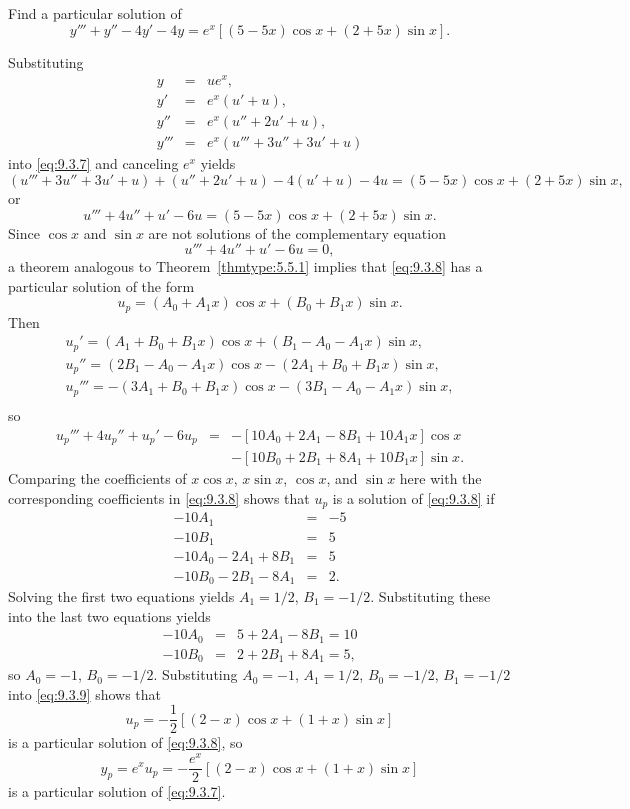 \documentclass{ximera}
\begin{document}
\begin{example}\label{example:9.3.3}
Find a particular solution of
\begin{equation} \label{eq:9.3.7}
y'''+y''-4y'-4y=e^x[(5-5x)\cos x+(2+5x)\sin x].
\end{equation}


\begin{explanation}
Substituting
\begin{eqnarray*}
y&=&ue^x,\\ y'&=&e^x(u'+u),\\
y''&=&e^x(u''+2u'+u),\\
y'''&=&e^x(u'''+3u''+3u'+u)
\end{eqnarray*}
into \eqref{eq:9.3.7} and canceling $e^x$ yields
$$
(u'''+3u''+3u'+u)+(u''+2u'+u)-4(u'+u)-4u
=(5-5x)\cos x+(2+5x)\sin x,
$$
or
\begin{equation} \label{eq:9.3.8}
u'''+4u''+u'-6u=(5-5x)\cos x+(2+5x)\sin x.
\end{equation}
Since $\cos x$ and $\sin x$ are not solutions of the complementary
equation
$$
u'''+4u''+u'-6u=0,
$$
a theorem analogous to Theorem~\ref{thmtype:5.5.1} implies that
\eqref{eq:9.3.8} has a particular solution of the form
\begin{equation} \label{eq:9.3.9}
u_p=(A_0+A_1x)\cos x+(B_0+B_1x)\sin x.
\end{equation}
Then
\begin{eqnarray*}
u_p'=(A_1+B_0+B_1x)\cos x+(B_1-A_0-A_1x)\sin x,\\
 u_p''=(2B_1-A_0-A_1x)\cos x-(2A_1+B_0+B_1x)\sin x,\\
 u_p'''=-(3A_1+B_0+B_1x)\cos x-(3B_1-A_0-A_1x)\sin x,\\
\end{eqnarray*}
so
$$
\begin{array}{rcl}
u_p'''+4u_p''+u_p'-6u_p&=&-\left[10A_0+2A_1-8B_1+10A_1x\right]\cos
x\\ &&- \left[10B_0+2B_1+8A_1+10B_1x\right]\sin x.
\end{array}
$$
Comparing the coefficients of $x\cos x$, $x\sin x$, $\cos x$, and
$\sin x$ here with the corresponding coefficients in \eqref{eq:9.3.8}
shows that $u_p$ is a solution of \eqref{eq:9.3.8} if
$$
\begin{array}{rcr}
-10A_1&=&-5\\
-10B_1&=&5\\
-10A_0-2A_1+8B_1&=&5\\
-10B_0-2B_1-8A_1&=&2.
\end{array}
$$
Solving the first two equations yields $A_1=1/2$, $B_1=-1/2$.
Substituting these into the last two equations  yields
\begin{eqnarray*}
-10A_0&=&5+2A_1-8B_1=10\\
-10B_0&=&2+2B_1+8A_1=5,
 \end{eqnarray*}
so $A_0=-1$, $B_0=-1/2$.
Substituting $A_0=-1$, $A_1=1/2$, $B_0=-1/2$, $B_1=-1/2$ into
\eqref{eq:9.3.9} shows that
$$
u_p=-\frac{1}{2}\left[(2-x)\cos
x+(1+x)\sin x\right]
$$
is a particular solution of  \eqref{eq:9.3.8}, so
$$
y_p=e^xu_p=-\frac{e^x}{2}\left[(2-x)\cos x+(1+x)\sin x\right]
$$
is a particular  solution of \eqref{eq:9.3.7}.


\end{explanation}
\end{example}
\end{document}
